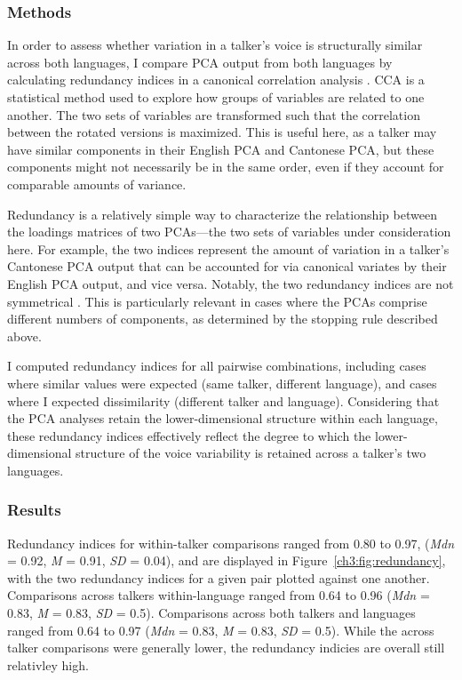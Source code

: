 \subsubsection{Methods}
In order to assess whether variation in a talker's voice is structurally similar across both languages, I compare PCA output from both languages by calculating redundancy indices in a canonical correlation analysis \citep[CCA][]{stewart_1968_canonical, jolliffe_2002_pca}.  CCA is a statistical method used to explore how groups of variables are related to one another. The two sets of variables are transformed such that the correlation between the rotated versions is maximized. This is useful here, as a talker may have similar components in their English PCA and Cantonese PCA, but these components might not necessarily be in the same order, even if they account for comparable amounts of variance.

Redundancy is a relatively simple way to characterize the relationship between the loadings matrices of two PCAs---the two sets of variables under consideration here. For example, the two indices represent the amount of variation in a talker's Cantonese PCA output that can be accounted for via canonical variates by their English PCA output, and vice versa. Notably, the two redundancy indices are not symmetrical \citep{stewart_1968_canonical}. This is particularly relevant in cases where the PCAs comprise different numbers of components, as determined by the stopping rule described above.

I computed redundancy indices for all pairwise combinations, including cases where similar values were expected (same talker, different language), and cases where I expected dissimilarity (different talker and language). Considering that the PCA analyses retain the lower-dimensional structure within each language, these redundancy indices effectively reflect the degree to which the lower-dimensional structure of the voice variability is retained across a talker's two languages.

\subsubsection{Results}

Redundancy indices for within-talker comparisons ranged from 0.80 to 0.97, (\textit{Mdn} = 0.92, \textit{M} = 0.91, \textit{SD} = 0.04), and are displayed in Figure~\ref{ch3:fig:redundancy}, with the two redundancy indices for a given pair plotted against one another. Comparisons across talkers within-language ranged from 0.64 to 0.96 (\textit{Mdn} = 0.83, \textit{M} = 0.83, \textit{SD} = 0.5). Comparisons across both talkers and languages ranged from 0.64 to 0.97 (\textit{Mdn} = 0.83, \textit{M} = 0.83, \textit{SD} = 0.5). While the across talker comparisons were generally lower, the redundancy indicies are overall still relativley high. 


